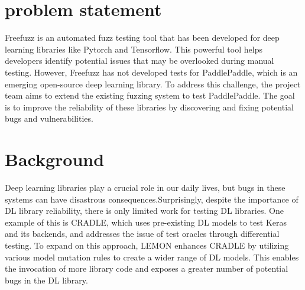 \documentclass[sigconf]{acmart}
\begin{document}


\maketitle

\section{problem statement}
Freefuzz is an automated fuzz testing tool that has been developed for deep learning 
libraries like Pytorch and Tensorflow. This powerful tool helps developers identify potential 
issues that may be overlooked during manual testing. However, Freefuzz has not developed tests for
 PaddlePaddle, which is an emerging open-source deep learning library. To address this challenge, 
 the project team aims to extend the existing fuzzing system to test PaddlePaddle. The goal is to 
 improve the reliability of these libraries by discovering and fixing potential bugs and vulnerabilities.

\section{Background}
Deep learning libraries play a crucial role in our daily lives, but bugs in these systems can have disastrous 
consequences.Surprisingly, despite the importance of DL library reliability, there is only limited work for testing
 DL libraries. One example of this is CRADLE, which uses pre-existing DL models to test Keras and its backends, 
 and addresses the issue of test oracles through differential testing. To expand on this approach, LEMON enhances 
 CRADLE by utilizing various model mutation rules to create a wider range of DL models. This enables the invocation 
 of more library code and exposes a greater number of potential bugs in the DL library.
\end{document}
